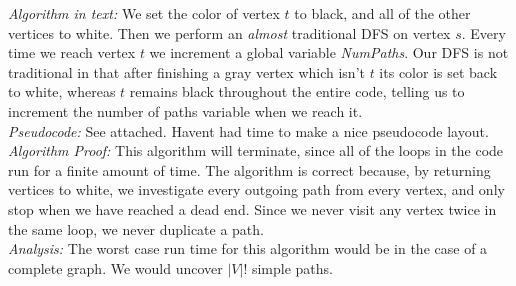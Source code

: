 \documentclass[10pt]{article}
\begin{document}
\emph{Algorithm in text: }We set the color of vertex $t$ to black, and all of the other vertices to white. Then we perform an \emph{almost} traditional DFS on vertex $s$. Every time we reach vertex $t$ we increment a global variable \emph{NumPaths}. Our DFS is not traditional in that after finishing a gray vertex which isn't $t$ its color is set back to white, whereas $t$ remains black throughout the entire code, telling us to increment the number of paths variable when we reach it.\\

\emph{Pseudocode:} See attached. Havent had time to make a nice pseudocode layout.\\

\emph{Algorithm Proof: } This algorithm will terminate, since all of the loops in the code run for a finite amount of time. The algorithm is correct because, by returning vertices to white, we investigate every outgoing path from every vertex, and only stop when we have reached a dead end. Since we never visit any vertex twice in the same loop, we never duplicate a path.\\

\emph{Analysis: } The worst case run time for this algorithm would be in the case of a complete graph. We would uncover $|V|!$ simple paths.
\end{document}
